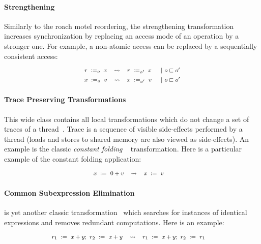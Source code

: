 \paragraph{Strengthening}

Similarly to the roach motel reordering, the strengthening
transformation increases synchronization by 
replacing an access mode of an operation by a stronger one. 
For example, a non-atomic access can be replaced by 
a sequentially consistent access: 
%
\[\def\arraystretch{1.4}\footnotesize
  \begin{array}{cccl} 

      \readInst{o}{r}{x} 
    & \leadsto 
    & \readInst{o'}{r}{x}
    & ~|~ o \sqsubset o' \\ 

      \writeInst{o}{x}{v}
    & \leadsto 
    & \writeInst{o'}{x}{v}
    & ~|~ o \sqsubset o'  \\ 

  \end{array}
\]

\paragraph{Trace Preserving Transformations}

This wide class contains all local transformations 
which do not change a set of traces of a thread~\cite{Sevcik-Aspinall:ECOOP08}.
Trace is a sequence of visible side-effects performed by a thread
(loads and stores to shared memory are also viewed as side-effects). 
An example is the classic \emph{constant folding}%
~\cite{Muchnick:ACDI97, Wegman-Zadeck:TOPLAS91} transformation.
Here is a particular example of the constant folding application:
%
\[\def\arraystretch{1.4}\footnotesize
  \begin{array}{cccl} 

      \writeInst{}{x}{0 + v} 
    & \leadsto 
    & \writeInst{}{x}{v}
    & \\ 

  \end{array}
\]
  
\paragraph{Common Subexpression Elimination}

\CSE is yet another classic transformation~\cite{Muchnick:ACDI97} 
which searches for instances of identical expressions 
and removes redundant computations. 
Here is an example: 
%
\[\def\arraystretch{1.4}\footnotesize
  \begin{array}{cccl} 

      \readInst{}{r_1}{x + y} \seq \readInst{}{r_2}{x + y} 
    & \leadsto 
    & \readInst{}{r_1}{x + y} \seq \readInst{}{r_2}{r_1}
    & \\ 

  \end{array}
\]

